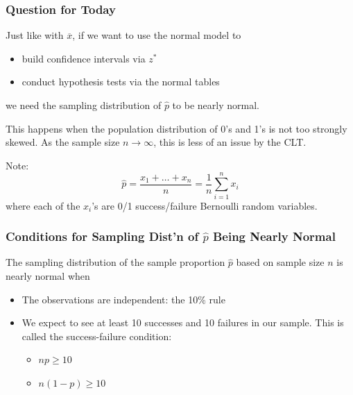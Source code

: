 \documentclass[handout]{beamer}
\newcommand{\blue}[1]{\textcolor{blue2}{#1}}
\newcommand{\xbar}{\overline{x}}
\newcommand{\phat}{\widehat{p}}
\begin{document}
\begin{frame}[fragile]
\frametitle{Question for Today}

Just like with $\xbar$, if we want to use the normal model to
\begin{itemize}
\item build confidence intervals via $z^*$
\item conduct hypothesis tests via the normal tables
\end{itemize}
we need the \blue{sampling distribution} of $\phat$ to be nearly normal.  

\vspace{0.25cm}
\pause This happens when the population distribution of 0's and 1's is not too strongly skewed.  As the sample size $n \longrightarrow \infty$, this is less of an issue by the CLT. 

%
%
\vspace{0.25cm}
\pause Note:  \[
\phat = \frac{x_1 + \ldots + x_n}{n} = \frac{1}{n}\sum_{i=1}^{n}x_i
\]
where each of the $x_i$'s are 0/1 success/failure \blue{Bernoulli} random variables.  
\end{frame}


\begin{frame}[fragile]
\frametitle{Conditions for Sampling Dist'n of $\phat$ Being Nearly Normal}
%
%
The sampling distribution of the \blue{sample proportion} $\phat$ based on sample size $n$ is nearly normal when

\begin{itemize}
\pause \item The observations are independent:  the 10\% rule
\pause \item We expect to see at least 10 successes and 10 failures in our sample.  This is called the \blue{success-failure condition}:
\begin{itemize}
\item $np \geq 10$
\item $n(1-p) \geq 10$ 
\end{itemize}
\end{itemize}
\end{frame}
\end{document}
